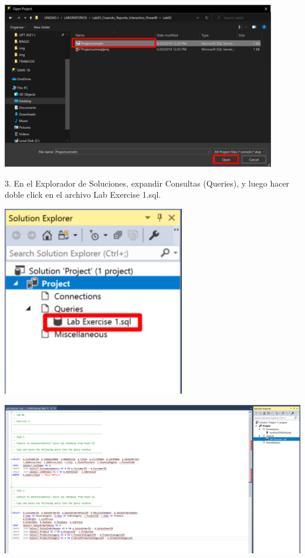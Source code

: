 \documentclass[12pt,letterpaper]{article}
\begin{document}
\begin{center}
    \includegraphics[width=12cm]{img/4.png}  
\end{center}
3. En el Explorador de Soluciones, expandir Consultas (Queries), y luego hacer doble click en el archivo Lab
Exercise 1.sql.
\begin{center}
    \includegraphics[width=8cm]{img/5.png}  
\end{center}
\begin{center}
    \includegraphics[width=15cm]{img/6.png}  
\end{center}
\end{document}
